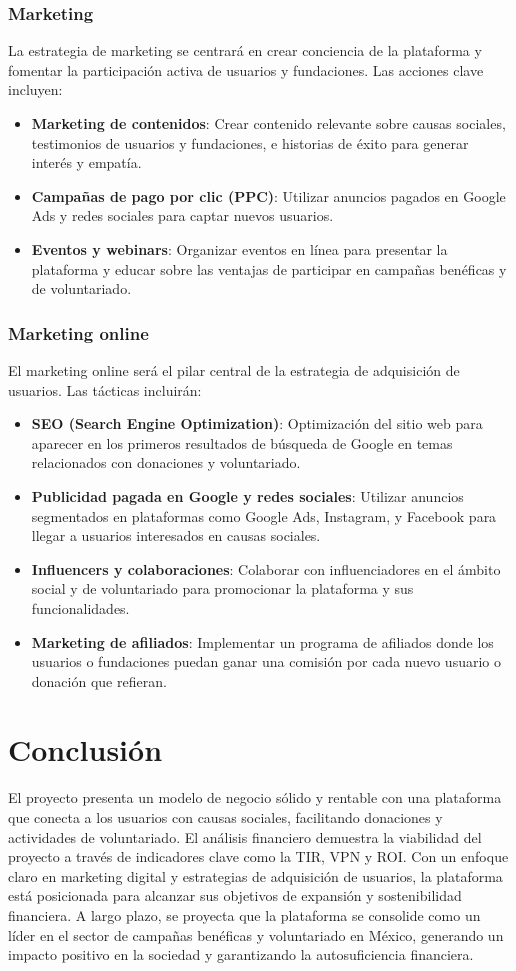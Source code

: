 \documentclass[a4paper,12pt]{article}
\begin{document}
\subsubsection{Marketing}
La estrategia de marketing se centrará en crear conciencia de la plataforma y fomentar la participación activa de usuarios y fundaciones. Las acciones clave incluyen:
\begin{itemize}
    \item \textbf{Marketing de contenidos}: Crear contenido relevante sobre causas sociales, testimonios de usuarios y fundaciones, e historias de éxito para generar interés y empatía.
    \item \textbf{Campañas de pago por clic (PPC)}: Utilizar anuncios pagados en Google Ads y redes sociales para captar nuevos usuarios.
    \item \textbf{Eventos y webinars}: Organizar eventos en línea para presentar la plataforma y educar sobre las ventajas de participar en campañas benéficas y de voluntariado.
\end{itemize}

\subsubsection{Marketing online}
El marketing online será el pilar central de la estrategia de adquisición de usuarios. Las tácticas incluirán:
\begin{itemize}
    \item \textbf{SEO (Search Engine Optimization)}: Optimización del sitio web para aparecer en los primeros resultados de búsqueda de Google en temas relacionados con donaciones y voluntariado.
    \item \textbf{Publicidad pagada en Google y redes sociales}: Utilizar anuncios segmentados en plataformas como Google Ads, Instagram, y Facebook para llegar a usuarios interesados en causas sociales.
    \item \textbf{Influencers y colaboraciones}: Colaborar con influenciadores en el ámbito social y de voluntariado para promocionar la plataforma y sus funcionalidades.
    \item \textbf{Marketing de afiliados}: Implementar un programa de afiliados donde los usuarios o fundaciones puedan ganar una comisión por cada nuevo usuario o donación que refieran.
\end{itemize}

\section{Conclusión}
El proyecto presenta un modelo de negocio sólido y rentable con una plataforma que conecta a los usuarios con causas sociales, facilitando donaciones y actividades de voluntariado. El análisis financiero demuestra la viabilidad del proyecto a través de indicadores clave como la TIR, VPN y ROI. Con un enfoque claro en marketing digital y estrategias de adquisición de usuarios, la plataforma está posicionada para alcanzar sus objetivos de expansión y sostenibilidad financiera. A largo plazo, se proyecta que la plataforma se consolide como un líder en el sector de campañas benéficas y voluntariado en México, generando un impacto positivo en la sociedad y garantizando la autosuficiencia financiera.
\end{document}
